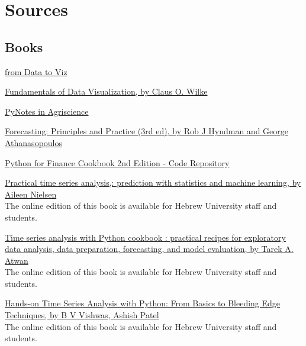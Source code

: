 \documentclass[
  letterpaper,
  DIV=11,
  numbers=noendperiod,
  oneside]{scrreprt}
\begin{document}

\hypertarget{sources}{%
\chapter*{Sources}\label{sources}}


\hypertarget{books}{%
\section*{Books}\label{books}}


\href{https://www.data-to-viz.com}{from Data to Viz}

\href{https://clauswilke.com/dataviz/}{Fundamentals of Data
Visualization, by Claus O. Wilke}

\href{https://soilwater.github.io/pynotes-agriscience/intro.html}{PyNotes
in Agriscience}

\href{https://otexts.com/fpp3/}{Forecasting: Principles and Practice
(3rd ed), by Rob J Hyndman and George Athanasopoulos}

\href{https://github.com/erykml/Python-for-Finance-Cookbook-2E}{Python
for Finance Cookbook 2nd Edition - Code Repository}

\href{https://huji.primo.exlibrisgroup.com/permalink/972HUJI_INST/10ptda2/alma9920842016603701}{Practical
time series analysis,: prediction with statistics and machine learning,
by Aileen Nielsen}\\
The online edition of this book is available for Hebrew University staff
and students.

\href{https://huji.primo.exlibrisgroup.com/permalink/972HUJI_INST/10ptda2/alma9921049267803701}{Time
series analysis with Python cookbook : practical recipes for exploratory
data analysis, data preparation, forecasting, and model evaluation, by
Tarek A. Atwan}\\
The online edition of this book is available for Hebrew University staff
and students.

\href{https://huji.primo.exlibrisgroup.com/permalink/972HUJI_INST/10ptda2/alma9920845706703701}{Hands-on
Time Series Analysis with Python: From Basics to Bleeding Edge
Techniques, by B V Vishwas, Ashish Patel}\\
The online edition of this book is available for Hebrew University staff
and students.
\end{document}
